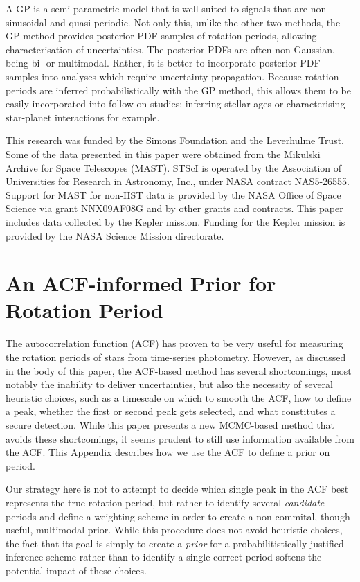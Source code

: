 \documentclass[useAMS, usenatbib, preprint, 12pt]{aastex}
\begin{document}
A GP is a semi-parametric model that is well suited to signals that are
non-sinusoidal and quasi-periodic.
Not only this, unlike the other two methods, the GP method provides posterior
PDF samples of rotation periods, allowing characterisation of uncertainties.
The posterior PDFs are often non-Gaussian, being bi- or multimodal.
Rather, it is better to incorporate posterior PDF samples into analyses which
require uncertainty propagation.
Because rotation periods are inferred probabilistically with the GP method,
this allows them to be easily incorporated into follow-on studies; inferring
stellar ages or characterising star-planet interactions for example.

This research was funded by the Simons Foundation and the Leverhulme Trust.
Some of the data presented in this paper were obtained from the Mikulski
Archive for Space Telescopes (MAST).
STScI is operated by the Association of Universities for Research in
Astronomy, Inc., under NASA contract NAS5-26555.
Support for MAST for non-HST data is provided by the NASA Office of Space
Science via grant NNX09AF08G and by other grants and contracts.
This paper includes data collected by the Kepler mission. Funding for the
Kepler mission is provided by the NASA Science Mission directorate.

\appendix

\section{An ACF-informed Prior for Rotation Period}

The autocorrelation function (ACF) has proven to be very useful
for measuring the rotation periods of stars from time-series
photometry.
However, as discussed in the body of this paper, the
ACF-based method has several shortcomings,
most notably the inability to deliver uncertainties, but also
the necessity of several heuristic choices,
such as a timescale on which to smooth the ACF,
how to define a peak, whether the first or second peak
gets selected, and what constitutes a secure detection.
While this paper presents a new MCMC-based method
that avoids these shortcomings,
it seems prudent to still use information available from the ACF.
This Appendix describes how we use the ACF to define a prior on period.

Our strategy here is not to attempt to decide which single
peak in the ACF best represents the true rotation period,
but rather to identify several \emph{candidate} periods and define
a weighting scheme in order to create a non-commital, though useful,
multimodal prior.  While this procedure does not avoid heuristic choices,
the fact that its goal is simply to create a \emph{prior} for a
probabilitistically justified inference scheme rather than
to identify a single correct period softens the potential impact
of these choices.
\end{document}
